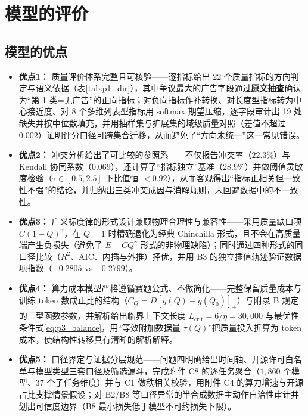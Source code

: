 \section{模型的评价}

\subsection{模型的优点}
\begin{itemize}[itemindent=2em]
\item \textbf{优点1：} 质量评价体系完整且可核验——逐指标给出 22 个质量指标的方向判定与语义依据（表\ref{tab:p1_dir}），其中争议最大的广告字段通过\textbf{原文抽查}确认为“第 1 类=无广告”的正向指标；对负向指标作补转换、对长度型指标转为中心接近度、对 8 个多维列表型指标用 softmax 期望压缩，逐字段审计出 19 处缺失并按中位数填充，并用抽样集与扩展集的域级质量对照（差值不超过 $0.002$）证明评分口径可跨集合迁移，从而避免了“方向未统一”这一常见错误。
\item \textbf{优点2：} 冲突分析给出了可比较的参照系——不仅报告冲突率（$22.3\%$）与 Kendall 协同系数（$0.069$），还计算了“指标独立”基准（$28.9\%$）并做阈值灵敏度检验（$\tau\in[0.5,2.5]$ 下比值恒 $<0.92$），从而客观得出“指标正相关但一致性不强”的结论，并归纳出三类冲突成因与消解规则，未回避数据中的不一致性。
\item \textbf{优点3：} 广义标度律的形式设计兼顾物理合理性与兼容性——采用质量缺口项 $C(1-Q)^{\gamma}$，在 $Q=1$ 时精确退化为经典 Chinchilla 形式，且不会在高质量端产生负损失（避免了 $E-CQ^{\gamma}$ 形式的非物理缺陷）；同时通过四种形式的同口径比较（$R^2$、AIC、内插与外推）择优，并用 B3 的独立插值轨迹验证数据项指数（$-0.2805$ vs $-0.2799$）。
\item \textbf{优点4：} 算力成本模型严格遵循赛题公式、不做简化——完整保留质量成本与训练 token 数成正比的结构（$C_Q=D[g(Q)-g(Q_0)]_+$）与附录 B 规定的三型函数参数，并解析给出临界上下文长度 $L_{\text{crit}}=6/\eta=30{,}000$ 与最优性条件式\eqref{eq:p3_balance}，用“等效附加数据量 $\tau(Q)$”把质量投入折算为 token 成本，使结构性转移具有清晰的解析解释。
\item \textbf{优点5：} 口径界定与证据分层规范——问题四明确给出时间轴、开源许可白名单与模型类型三套口径及筛选漏斗，完成附件 C8 的逐任务聚合（$1{,}860$ 个模型、$37$ 个子任务维度）并与 C1 做秩相关校验，用附件 C4 的算力增速与开源占比支撑情景假设；对 B2/B8 等口径异常的半合成数据主动作自洽性审计并划出可信度边界（B8 最小损失低于模型不可约损失下限）。
\end{itemize}

